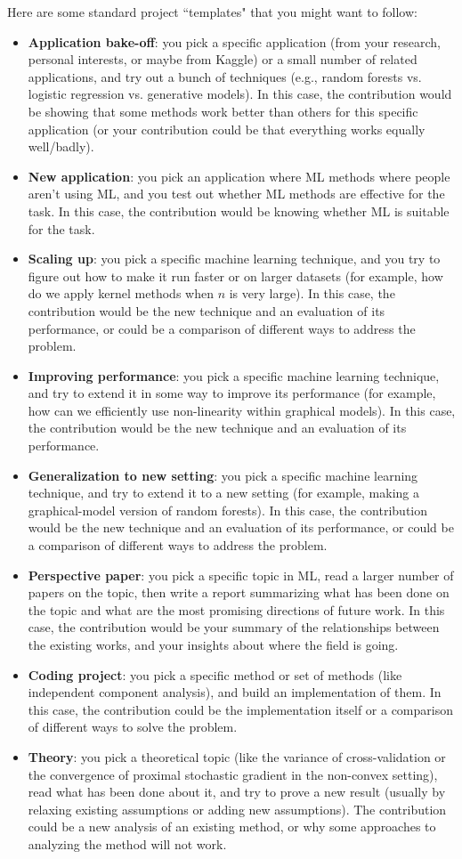 \documentclass{article}
\def\items#1{\begin{itemize}#1\end{itemize}}
\begin{document}
Here are some standard project ``templates" that you might want to follow:

\items{
\item \textbf{Application bake-off}: you pick a specific application (from your research, personal interests, or maybe from Kaggle) or a small number of related applications, and try out a bunch of techniques (e.g., random forests vs. logistic regression vs. generative models). In this case, the contribution would be showing that some methods work better than others for this specific application (or your contribution could be that everything works equally well/badly).
\item \textbf{New application}: you pick an application where ML methods where people aren't using ML, and you test out whether ML methods are effective for the task. In this case, the contribution would be knowing whether ML is suitable for the task.
\item \textbf{Scaling up}: you pick a specific machine learning technique, and you try to figure out how to make it run faster or on larger datasets (for example, how do we apply kernel methods when $n$ is very large). In this case, the contribution would be the new technique and an evaluation of its performance, or could be a comparison of different ways to address the problem.
\item \textbf{Improving performance}: you pick a specific machine learning technique, and try to extend it in some way to improve its performance (for example, how can we efficiently use non-linearity within graphical models). In this case, the contribution would be the new technique and an evaluation of its performance.
\item \textbf{Generalization to new setting}: you pick a specific machine learning technique, and try to extend it to a new setting (for example, making a graphical-model version of random forests).  In this case, the contribution would be the new technique and an evaluation of its performance, or could be a comparison of different ways to address the problem.
\item \textbf{Perspective paper}: you pick a specific topic in ML, read a larger number of papers on the topic, then write a report summarizing what has been done on the topic and what are the most promising directions of future work. In this case, the contribution would be your summary of the relationships between the existing works, and your insights about where the field is going.
\item \textbf{Coding project}: you pick a specific method or set of methods (like independent component analysis), and build an implementation of them. In this case, the contribution could be the implementation itself or a comparison of different ways to solve the problem.
\item \textbf{Theory}: you pick a theoretical topic (like the variance of cross-validation or the convergence of proximal stochastic gradient in the non-convex setting), read what has been done about it, and try to prove a new result (usually by relaxing existing assumptions or adding new assumptions). The contribution could be a new analysis of an existing method, or why some approaches to analyzing the method will not work.
}
\end{document}
